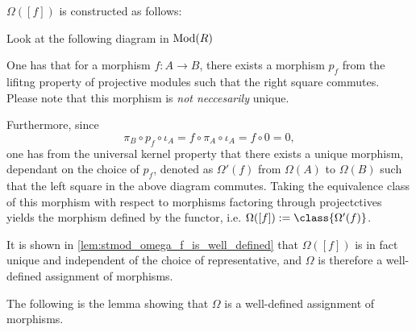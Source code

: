 \begin{remark}
    \label{rem:stmod_omega_f}
    \( \Omega([f]) \) is constructed as follows:

    Look at the following diagram in \( \operatorname{Mod}(R) \)
    \begin{center}
    \end{center}

    One has that for a morphism \( f: A \to B \), there exists a morphism \( p_f \) from the lifitng property of projective modules such that the right square commutes. Please note that this morphism is \emph{not neccesarily} unique.

    Furthermore, since
    \[
        \pi_B \circ p_f \circ \iota_A = f \circ \pi_A \circ \iota_A = f \circ 0 = 0,
    \]
    one has from the universal kernel property that there exists a unique morphism, dependant on the choice of \( p_f \), denoted as \( \Omega'(f) \) from \( \Omega(A) \) to \( \Omega(B) \) such that the left square in the above diagram commutes. Taking the equivalence class of this morphism with respect to morphisms factoring through projectctives yields the morphism defined by the functor, i.e. \( \Omega([f]) := \class{\Omega'(f)} \).

    It is shown in \autoref{lem:stmod_omega_f_is_well_defined} that \( \Omega([f]) \) is in fact unique and independent of the choice of representative, and \( \Omega \) is therefore a well-defined assignment of morphisms.
\end{remark}

The following is the lemma showing that \( \Omega \) is a well-defined assignment of morphisms.


